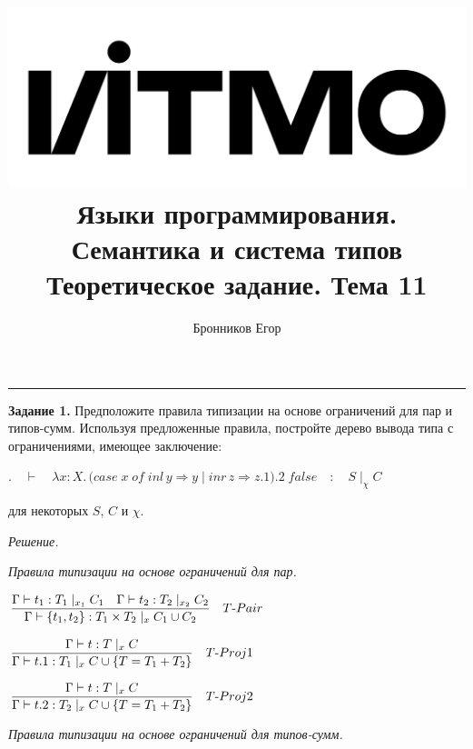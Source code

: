 \documentclass[landscape, 11pt]{report}
\title{
	\includegraphics[scale=0.07]{logo}\\
	\vspace{0.5em}
	Языки программирования. Семантика и система типов\\
	\vspace{0.2em}
	\Large Теоретическое задание. Тема 11
}
\author{Бронников Егор}
\date{}
\begin{document}
	
	
	\maketitle
	
	\vspace{-0.5cm}
	\hrule
	\vspace{0.5cm}
	
	
	\textbf{Задание 1.} Предположите правила типизации на основе ограничений для пар и типов-сумм. Используя предложенные правила, постройте дерево вывода типа с ограничениями, имеющее заключение:
	
	\begin{center}
		$. \quad \vdash \quad \lambda x : X . \, (case \; x \; of \; inl \, y \Rightarrow y \; | \; inr \, z \Rightarrow z.1).2 \; false \quad : \quad S \; |_{\chi} \; C$
	\end{center}
	
	для некоторых $S$, $C$ и $\chi$.
	
	\vspace{0.2cm}

	\textit{Решение.}
	
	\vspace{0.2cm}
	
	\textit{Правила типизации на основе ограничений для пар.}
	
	\vspace{0.2cm}
	
	$\dfrac{\Gamma \vdash t_1 : T_1 \; |_{x_1} \; C_1 \quad \Gamma \vdash t_2 : T_2 \; |_{x_2} \; C_2}{\Gamma \vdash \{t_1, t_2\} : T_1 \times T_2 \; |_{x} \; C_1 \cup C_2} \quad T\textup{-}Pair$
	
	\vspace{0.15cm}
	
	$\dfrac{\Gamma \vdash t : T \; |_{x} \; C}{\Gamma \vdash t.1 : T_1 \; |_x \; C \cup \{T = T_1 + T_2\}} \quad T\textup{-}Proj1$
	
	\vspace{0.15cm}

	$\dfrac{\Gamma \vdash t : T \; |_{x} \; C}{\Gamma \vdash t.2 : T_2 \; |_x \; C \cup \{T = T_1 + T_2\}} \quad T\textup{-}Proj2$

	\vspace{0.25cm}

	\textit{Правила типизации на основе ограничений для типов-сумм.}

	\vspace{0.2cm}
\end{document}
